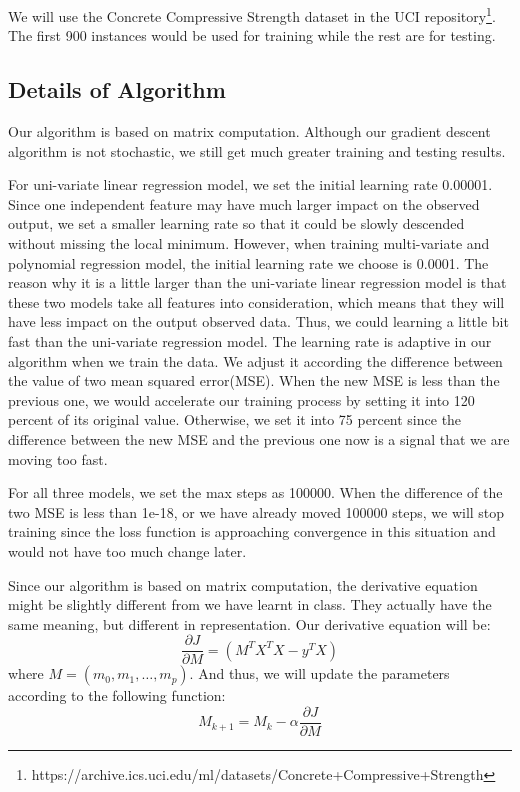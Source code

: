 \documentclass{article}
\begin{document}
We will use the Concrete Compressive Strength dataset in the UCI repository\footnote{https://archive.ics.uci.edu/ml/datasets/Concrete+Compressive+Strength}. The first 900 instances would be used for training while the rest are for testing.

\subsection{Details of Algorithm}
Our algorithm is based on matrix computation. Although our gradient descent algorithm is not stochastic, we still get much greater training and testing results. 

For uni-variate linear regression model, we set the initial learning rate 0.00001. Since one independent feature may have much larger impact on the observed output, we set a smaller learning rate so that it could be slowly descended without missing the local minimum. However, when training multi-variate and polynomial regression model, the initial learning rate we choose is 0.0001. The reason why it is a little larger than the uni-variate linear regression model is that these two models take all features into consideration, which means that they will have less impact on the output observed data. Thus, we could learning a little bit fast than the uni-variate regression model. The learning rate is adaptive in our algorithm when we train the data. We adjust it according the difference between the value of two mean squared error(MSE). When the new MSE is less than the previous one, we would accelerate our training process by setting it into 120 percent of its original value. Otherwise, we set it into 75 percent since the difference between the new MSE and the previous one now is a signal that we are moving too fast.

For all three models, we set the max steps as 100000. When the difference of the two MSE is less than 1e-18, or we have already moved 100000 steps, we will stop training since the loss function is approaching convergence in this situation and would not have too much change later. 

Since our algorithm is based on matrix computation, the derivative equation might be slightly different from we have learnt in class. They actually have the same meaning, but different in representation. Our derivative equation will be:
\begin{equation*}
  \frac{\partial J}{\partial M} = (M^T X^T X - y ^TX)
\end{equation*}
where $M = (m_0, m_1, \dots, m_p)$. And thus, we will update the parameters according to the following function:
\begin{equation*}
  M_{k+1} = M_k - \alpha  \frac{\partial J}{\partial M}
\end{equation*}
\end{document}
